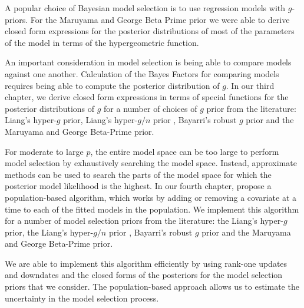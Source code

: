 
A popular choice of Bayesian model selection is to use regression models with $g$-priors. For the Maruyama
and George Beta Prime prior \citep{Maruyama2011} we were able to derive closed form expressions for the
posterior distributions of most of the parameters of the model in terms of the hypergeometric function.




An important consideration in model selection is being able to compare models against one another.
Calculation of the Bayes Factors for comparing models requires being able to compute the posterior
distribution of $g$. In our third chapter, we derive closed form expressions in terms of special functions for the posterior
distributions of $g$ for a number of choices of $g$ prior from the literature:
Liang's hyper-$g$ prior,
Liang's hyper-$g/n$ prior \citep{Liang2008},
Bayarri's robust $g$ prior \citep{Bayarri2012} and the 
Maruyama and George Beta-Prime \citep{Maruyama2011} prior.	


For moderate to large $p$, the entire model space can be too large to perform model selection by
exhaustively searching the model space. Instead, approximate methods can be used to search the parts of the
model space for which the posterior model likelihood is the highest. In our fourth chapter, propose a population-based algorithm,
which works by adding or removing a covariate at a time to each of the fitted models in the population.
We implement this algorithm for a number of model selection priors from the literature:
the Liang's hyper-$g$ prior,
the Liang's hyper-$g/n$ prior \citep{Liang2008},
Bayarri's robust $g$ prior \citep{Bayarri2012} and the 
Maruyama and George Beta-Prime \citep{Maruyama2011} prior.	

We are able to implement this algorithm efficiently by using rank-one updates and downdates and the closed
forms of the posteriors for the model selection priors that we consider. The population-based approach allows
us to estimate the uncertainty in the model selection process.


